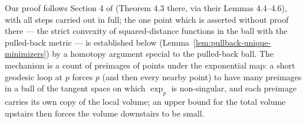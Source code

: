 Our proof follows Section 4 of \cite{CheegerGromovTaylor}
(Theorem 4.3 there, via their Lemmas 4.4--4.6), with all steps
carried out in full; the one point which is asserted without proof
there --- the strict convexity of squared-distance functions in the
ball with the pulled-back metric --- is established below
(Lemma~\ref{lem:pullback-unique-minimizers}) by a homotopy argument
special to the pulled-back ball. The mechanism is a count of
preimages of points under the exponential map: a short geodesic
loop at $p$ forces $p$ (and then every nearby point) to have many
preimages in a ball of the tangent space on which
$\exp_p$ is non-singular, and each preimage carries its own copy
of the local volume; an upper bound for the total volume upstairs
then forces the volume downstairs to be small.

\begin{lemma}
\label{lem:pullback-ball}



\end{lemma}

